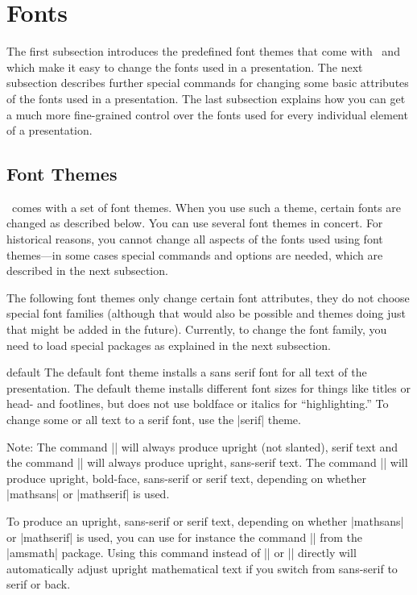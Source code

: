 %
%
%


\section{Fonts}
\label{section-fonts}

The first subsection introduces the predefined font themes that come with \beamer\ and which make it easy to change the fonts used in a presentation. The next subsection describes further special commands for changing some basic attributes of the fonts used in a presentation. The last subsection explains how you can get a much more fine-grained control over the fonts used for every individual element of a presentation.


\subsection{Font Themes}

\beamer\ comes with a set of font themes. When you use such a theme, certain fonts are changed as described below. You can use several font themes in concert. For historical reasons, you cannot change all aspects of the fonts used using font themes---in some cases special commands and options are needed, which are described in the next subsection.

The following font themes only change certain font attributes, they do not choose special font families (although that would also be possible and themes doing just that might be added in the future). Currently, to change the font family, you need to load special packages as explained in the next subsection.


\begin{fontthemeexample}{default}
  The default font theme installs a sans serif font for all text of the presentation. The default theme installs different font sizes for things like titles or head- and footlines, but does not use boldface or italics for ``highlighting.'' To change some or all text to a serif font, use the |serif| theme.

  Note: The command |\mathrm| will always produce upright (not slanted), serif text and the command |\mathsf| will always produce upright, sans-serif text. The command |\mathbf| will produce upright, bold-face, sans-serif or serif text, depending on whether |mathsans| or |mathserif| is used.

  To produce an upright, sans-serif or serif text, depending on whether |mathsans| or |mathserif| is used, you can use for instance the command |\operatorname| from the |amsmath| package. Using this command instead of |\mathrm| or |\mathsf| directly will automatically adjust upright mathematical text if you switch from sans-serif to serif or back.
\end{fontthemeexample}

